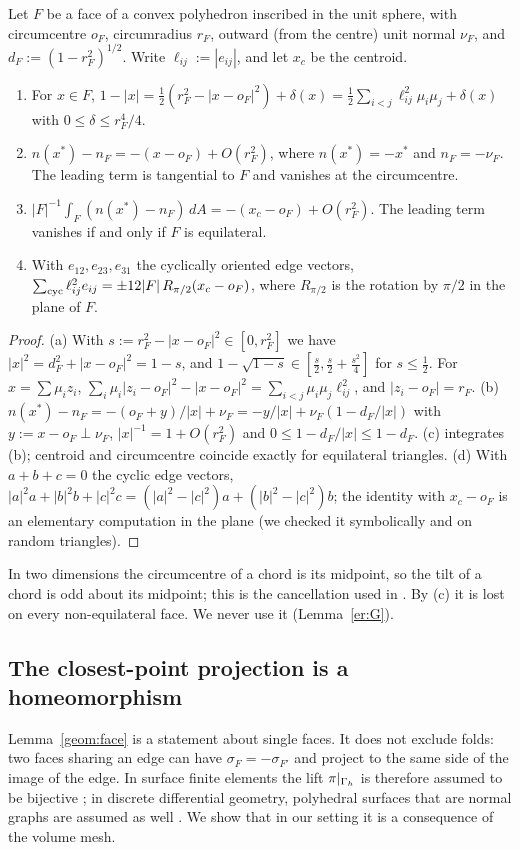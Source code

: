 \begin{lemma}\label{geom:sag}
Let $F$ be a face of a convex polyhedron inscribed in the unit sphere, with circumcentre $o_F$, circumradius $r_F$, outward (from the centre) unit normal $\nu_F$, and $d_F:=(1-r_F^2)^{1/2}$. Write $\ell_{ij}:=|e_{ij}|$, and let $x_c$ be the centroid.
\begin{enumerate}[label=(\alph*)]
\item For $x\in F$, $1-|x|=\frac12(r_F^2-|x-o_F|^2)+\delta(x)=\frac12\sum_{i<j}\ell_{ij}^2\mu_i\mu_j+\delta(x)$ with $0\le\delta\le r_F^4/4$.
\item $n(x^\ast)-n_F=-(x-o_F)+O(r_F^2)$, where $n(x^\ast)=-x^\ast$ and $n_F=-\nu_F$. The leading term is tangential to $F$ and vanishes at the circumcentre.
\item $|F|^{-1}\int_F(n(x^\ast)-n_F)\,dA=-(x_c-o_F)+O(r_F^2)$. The leading term vanishes if and only if $F$ is equilateral.
\item With $e_{12},e_{23},e_{31}$ the cyclically oriented edge vectors, $\sum_{\rm cyc}\ell_{ij}^2e_{ij}=\pm12|F|\,R_{\pi/2}(x_c-o_F)$, where $R_{\pi/2}$ is the rotation by $\pi/2$ in the plane of $F$.
\end{enumerate}
\end{lemma}

\begin{proof}
(a) With $s:=r_F^2-|x-o_F|^2\in[0,r_F^2]$ we have $|x|^2=d_F^2+|x-o_F|^2=1-s$, and $1-\sqrt{1-s}\in[\frac s2,\frac s2+\frac{s^2}4]$ for $s\le\frac12$. For $x=\sum\mu_iz_i$, $\sum_i\mu_i|z_i-o_F|^2-|x-o_F|^2=\sum_{i<j}\mu_i\mu_j\ell_{ij}^2$, and $|z_i-o_F|=r_F$.
(b) $n(x^\ast)-n_F=-(o_F+y)/|x|+\nu_F=-y/|x|+\nu_F(1-d_F/|x|)$ with $y:=x-o_F\perp\nu_F$, $|x|^{-1}=1+O(r_F^2)$ and $0\le1-d_F/|x|\le1-d_F$. (c) integrates (b); centroid and circumcentre coincide exactly for equilateral triangles. (d) With $a+b+c=0$ the cyclic edge vectors, $|a|^2a+|b|^2b+|c|^2c=(|a|^2-|c|^2)a+(|b|^2-|c|^2)b$; the identity with $x_c-o_F$ is an elementary computation in the plane (we checked it symbolically and on random triangles).
\end{proof}
In two dimensions the circumcentre of a chord is its midpoint, so the tilt of a chord is odd about its midpoint; this is the cancellation used in \cite{PadhiLong2D}. By (c) it is lost on every non-equilateral face. We never use it (Lemma~\ref{er:G}).

\subsection{The closest-point projection is a homeomorphism}\label{geom:sec:lift}
Lemma~\ref{geom:face} is a statement about single faces. It does not exclude folds: two faces sharing an edge can have $\sigma_F=-\sigma_{F'}$ and project to the same side of the image of the edge. In surface finite elements the lift $\pi|_{\Gamma_h}$ is therefore assumed to be bijective \cite{Dziuk1988,DziukElliott2013}; in discrete differential geometry, polyhedral surfaces that are normal graphs are assumed as well \cite{HildebrandtPolthierWardetzky2006,MorvanThibert2004}. We show that in our setting it is a consequence of the volume mesh.

